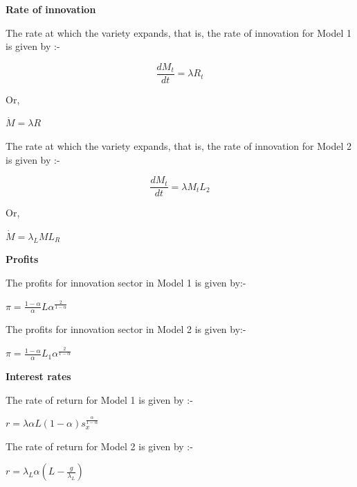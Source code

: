 \documentclass[a4paper, 12pt]{article}
\begin{document}
\begin{flushleft}
	\textbf{Rate of innovation}
	\begin{flushleft}
		The rate at which the variety expands, that is, the rate of innovation for Model 1 is given by :-
		\begin{center}
			$$ \frac{dM_t}{dt}=\lambda R_t $$
		\end{center}
		\begin{flushleft}
			Or,
		\end{flushleft}
		\begin{center}
			$\dot{M}=\lambda R  $
		\end{center}
	\end{flushleft}
	\begin{flushleft}
		The rate at which the variety expands, that is, the rate of innovation for Model 2 is given by :-
		\begin{center}
			$$ \frac{dM_t}{dt}=\lambda M_t L_2 $$
		\end{center}
		\begin{flushleft}
			Or,
		\end{flushleft}
		\begin{center}
			$\dot{M}=\lambda_L M L_R  $
		\end{center}
	\end{flushleft}
\end{flushleft}
\newpage
\begin{flushleft}
	\textbf{Profits}
	\begin{flushleft}
		The profits for innovation sector in Model 1 is given by:-
	\end{flushleft}
	\begin{center}
		$ \pi = \frac{1-\alpha}{\alpha}L \alpha^{\frac {2}{1-\alpha}} $
	\end{center}
	\begin{flushleft}
		The profits for innovation sector in Model 2 is given by:-
	\end{flushleft}
	\begin{center}
		$ \pi = \frac{1-\alpha}{\alpha}L_1 \alpha^{\frac {2}{1-\alpha}} $
	\end{center}
\end{flushleft}
\newpage
\begin{flushleft}
	\textbf{Interest rates}
	\begin{flushleft}
		The rate of return for Model 1 is given by :-
	\end{flushleft}
	\begin{center}
		$r = \lambda\alpha L(1-\alpha)s_x^{\frac{\alpha}{1-\alpha}}$
	\end{center}
		\begin{flushleft}
			The rate of return for Model 2 is given by :-
		\end{flushleft}
		\begin{center}
			$r = \lambda_L\alpha (L-\frac {g}{\lambda_L})$
		\end{center}
\end{flushleft}
\end{document}
